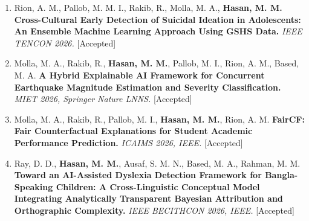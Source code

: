 \documentclass[a4paper,11pt]{article}
\begin{document}
\begin{enumerate}[leftmargin=1.5em, itemsep=6pt, topsep=0pt]
\item Rion, A. M., Pallob, M. M. I., Rakib, R., Molla, M. A., \textbf{Hasan, M. M.}
\textbf{Cross-Cultural Early Detection of Suicidal Ideation in Adolescents: An Ensemble Machine Learning Approach Using GSHS Data.}
\textit{IEEE TENCON 2026.} \textcolor{teamgreen}{[Accepted]}

\item Molla, M. A., Rakib, R., \textbf{Hasan, M. M.}, Pallob, M. I., Rion, A. M., Based, M. A.
\textbf{A Hybrid Explainable AI Framework for Concurrent Earthquake Magnitude Estimation and Severity Classification.}
\textit{MIET 2026, Springer Nature LNNS.} \textcolor{teamgreen}{[Accepted]}

\item Molla, M. A., Rakib, R., Pallob, M. I., \textbf{Hasan, M. M.}, Rion, A. M.
\textbf{FairCF: Fair Counterfactual Explanations for Student Academic Performance Prediction.}
\textit{ICAIMS 2026, IEEE.} \textcolor{teamgreen}{[Accepted]}

\item Ray, D. D., \textbf{Hasan, M. M.}, Ausaf, S. M. N., Based, M. A., Rahman, M. M.
\textbf{Toward an AI-Assisted Dyslexia Detection Framework for Bangla-Speaking Children: A Cross-Linguistic Conceptual Model Integrating Analytically Transparent Bayesian Attribution and Orthographic Complexity.}
\textit{IEEE BECITHCON 2026, IEEE.} \textcolor{teamgreen}{[Accepted]}

\end{enumerate}
\end{document}
